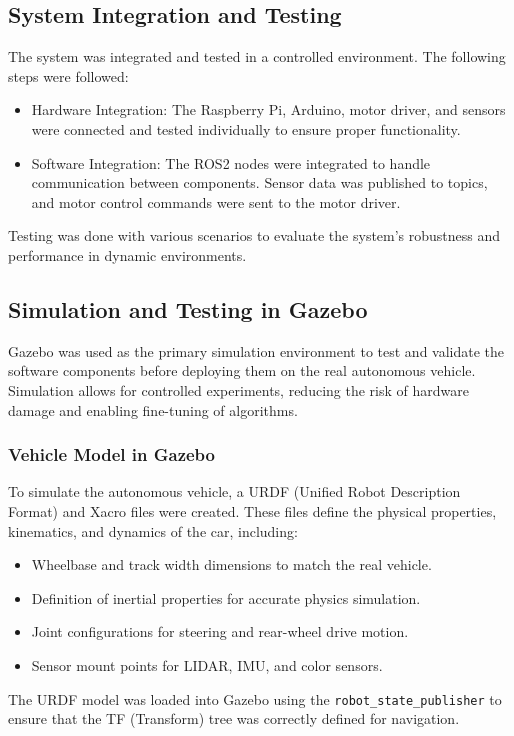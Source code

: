 \documentclass[english,project]{buwthesis}
\begin{document}
\subsection{System Integration and Testing}
The system was integrated and tested in a controlled environment. The following steps were followed:
\begin{itemize}
    \item Hardware Integration: The Raspberry Pi, Arduino, motor driver, and sensors were connected and tested individually to ensure proper functionality.
    \item Software Integration: The ROS2 nodes were integrated to handle communication between components. Sensor data was published to topics, and motor control commands were sent to the motor driver.

\end{itemize}
Testing was done with various scenarios to evaluate the system's robustness and performance in dynamic environments.

\subsection{Simulation and Testing in Gazebo}
Gazebo was used as the primary simulation environment to test and validate the software components before deploying them on the real autonomous vehicle. Simulation allows for controlled experiments, reducing the risk of hardware damage and enabling fine-tuning of algorithms.

\subsubsection{Vehicle Model in Gazebo}
To simulate the autonomous vehicle, a URDF (Unified Robot Description Format) and Xacro files were created. These files define the physical properties, kinematics, and dynamics of the car, including:
\begin{itemize}
    \item Wheelbase and track width dimensions to match the real vehicle.
    \item Definition of inertial properties for accurate physics simulation.
    \item Joint configurations for steering and rear-wheel drive motion.
    \item Sensor mount points for LIDAR, IMU, and color sensors.
\end{itemize}
The URDF model was loaded into Gazebo using the \texttt{robot\_state\_publisher} to ensure that the TF (Transform) tree was correctly defined for navigation.
\end{document}
